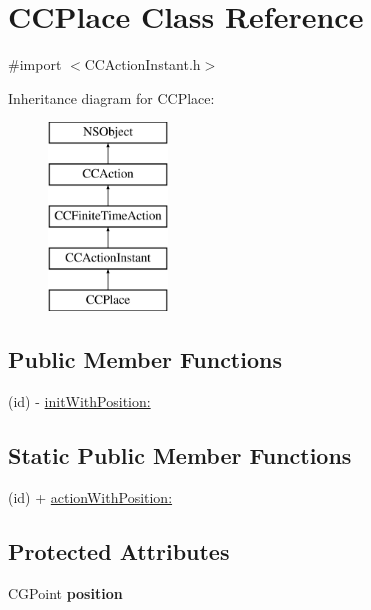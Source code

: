 \hypertarget{interface_c_c_place}{\section{C\-C\-Place Class Reference}
\label{interface_c_c_place}
}


{\ttfamily \#import $<$C\-C\-Action\-Instant.\-h$>$}

Inheritance diagram for C\-C\-Place\-:\begin{figure}[H]
\begin{center}
\leavevmode
\includegraphics[height=5.000000cm]{interface_c_c_place}
\end{center}
\end{figure}
\subsection*{Public Member Functions}
\begin{DoxyCompactItemize}
\item 
(id) -\/ \hyperlink{interface_c_c_place_a53e5d4a059ae00da30872e6b172fbe49}{init\-With\-Position\-:}
\end{DoxyCompactItemize}
\subsection*{Static Public Member Functions}
\begin{DoxyCompactItemize}
\item 
(id) + \hyperlink{interface_c_c_place_ae63d85b70a325d1006ef8db2a98a96a3}{action\-With\-Position\-:}
\end{DoxyCompactItemize}
\subsection*{Protected Attributes}
\begin{DoxyCompactItemize}
\item 
\hypertarget{interface_c_c_place_ab84db3c252acd256ca618cc01c84bde0}{C\-G\-Point {\bfseries position}}\label{interface_c_c_place_ab84db3c252acd256ca618cc01c84bde0}

\end{DoxyCompactItemize}


